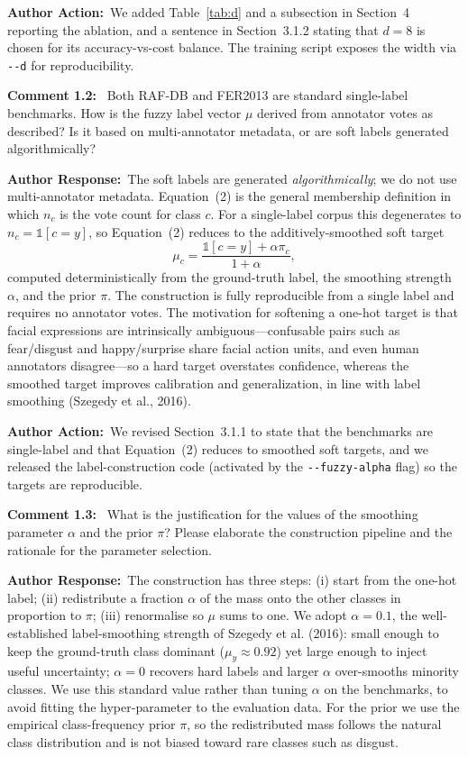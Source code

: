 \documentclass[11pt]{article}
\newcommand{\comment}[1]{\smallskip\noindent\textbf{\color{navy}Comment #1:}\ }
\newcommand{\response}{\smallskip\par\noindent\textbf{\color{steel}Author Response:}\ }
\newcommand{\action}{\smallskip\par\noindent\textbf{\color{steel}Author Action:}\ }
\begin{document}
\action We added Table~\ref{tab:d} and a subsection in Section~4 reporting the ablation, and
a sentence in Section~3.1.2 stating that $d=8$ is chosen for its accuracy-vs-cost balance.
The training script exposes the width via \texttt{-{}-d} for reproducibility.

\comment{1.2} Both RAF-DB and FER2013 are standard single-label benchmarks. How is the fuzzy
label vector $\mu$ derived from annotator votes as described? Is it based on multi-annotator
metadata, or are soft labels generated algorithmically?

\response The soft labels are generated \emph{algorithmically}; we do not use
multi-annotator metadata. Equation~(2) is the general membership definition in which $n_c$
is the vote count for class $c$. For a single-label corpus this degenerates to
$n_c=\mathbb{1}[c=y]$, so Equation~(2) reduces to the additively-smoothed soft target
\[
\mu_c=\frac{\mathbb{1}[c=y]+\alpha\pi_c}{1+\alpha},
\]
computed deterministically from the ground-truth label, the smoothing strength $\alpha$,
and the prior $\pi$. The construction is fully reproducible from a single label and requires
no annotator votes. The motivation for softening a one-hot target is that facial expressions
are intrinsically ambiguous---confusable pairs such as fear/disgust and happy/surprise share
facial action units, and even human annotators disagree---so a hard target overstates
confidence, whereas the smoothed target improves calibration and generalization, in line
with label smoothing (Szegedy et al., 2016).

\action We revised Section~3.1.1 to state that the benchmarks are single-label and that
Equation~(2) reduces to smoothed soft targets, and we released the label-construction code
(activated by the \texttt{-{}-fuzzy-alpha} flag) so the targets are reproducible.

\comment{1.3} What is the justification for the values of the smoothing parameter $\alpha$
and the prior $\pi$? Please elaborate the construction pipeline and the rationale for the
parameter selection.

\response The construction has three steps: (i) start from the one-hot label; (ii)
redistribute a fraction $\alpha$ of the mass onto the other classes in proportion to $\pi$;
(iii) renormalise so $\mu$ sums to one. We adopt $\alpha=0.1$, the well-established
label-smoothing strength of Szegedy et al. (2016): small enough to keep the ground-truth
class dominant ($\mu_y\approx0.92$) yet large enough to inject useful uncertainty; $\alpha=0$
recovers hard labels and larger $\alpha$ over-smooths minority classes. We use this standard
value rather than tuning $\alpha$ on the benchmarks, to avoid fitting the hyper-parameter to
the evaluation data. For the prior we use the empirical class-frequency prior $\pi$, so the
redistributed mass follows the natural class distribution and is not biased toward rare
classes such as disgust.
\end{document}
